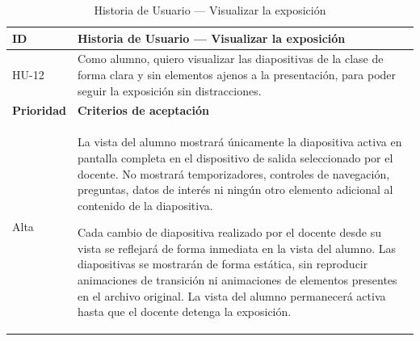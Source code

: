 \documentclass[11pt]{article}
\begin{document}
\begin{table}[H]
    \centering
    \renewcommand{\arraystretch}{1.2}
    \begin{tabular}{|p{2.5cm}|p{11cm}|}
        \hline
        \textbf{ID} & \textbf{Historia de Usuario --- Visualizar la exposición} \\
        \hline
        HU-12 & Como alumno, quiero visualizar las diapositivas de la clase de forma clara y sin elementos ajenos a la presentación, para poder seguir la exposición sin distracciones. \\
        \hline
        \textbf{Prioridad} & \textbf{Criterios de aceptación} \\
        \hline
        Alta & La vista del alumno mostrará únicamente la diapositiva activa en pantalla completa en el dispositivo de salida seleccionado por el docente. No mostrará temporizadores, controles de navegación, preguntas, datos de interés ni ningún otro elemento adicional al contenido de la diapositiva.

        Cada cambio de diapositiva realizado por el docente desde su vista se reflejará de forma inmediata en la vista del alumno. Las diapositivas se mostrarán de forma estática, sin reproducir animaciones de transición ni animaciones de elementos presentes en el archivo original. La vista del alumno permanecerá activa hasta que el docente detenga la exposición. \\
        \hline
    \end{tabular}
    \caption{Historia de Usuario --- Visualizar la exposición}
    \label{tab:hu-visualizar-exposicion}
\end{table}
\end{document}
